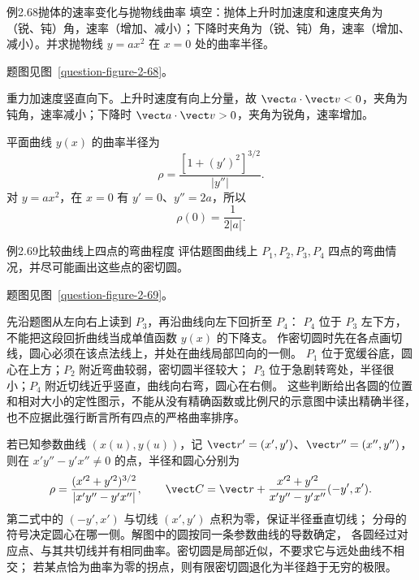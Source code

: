 \begin{origexamplebox}{例2.68\quad 抛体的速率变化与抛物线曲率}
填空：抛体上升时加速度和速度夹角为（锐、钝）角，速率（增加、减小）；下降时夹角为（锐、钝）角，速率（增加、减小）。并求抛物线 $y=ax^2$ 在 $x=0$ 处的曲率半径。
\par 题图见图~\ref{question-figure-2-68}。
\KQuestionCQ
\end{origexamplebox}
\begin{xesolution}
重力加速度竖直向下。上升时速度有向上分量，故 $\vect a\cdot\vect v<0$，夹角为钝角，速率减小；下降时 $\vect a\cdot\vect v>0$，夹角为锐角，速率增加。


\ProjectileCurvatureDiagram
平面曲线 $y(x)$ 的曲率半径为
\[
\rho=\frac{[1+(y')^2]^{3/2}}{|y''|}.
\]
对 $y=ax^2$，在 $x=0$ 有 $y'=0$、$y''=2a$，所以
\[
 \boxed{\rho(0)=\frac1{2|a|}}.
\]
\end{xesolution}

\ifdefined\Needspace{}\fi
\begin{origexamplebox}{例2.69\quad 比较曲线上四点的弯曲程度}
评估题图曲线上 $P_1,P_2,P_3,P_4$ 四点的弯曲情况，并尽可能画出这些点的密切圆。
\par 题图见图~\ref{question-figure-2-69}。
\KQuestionCR
\end{origexamplebox}
\begin{xesolution}
先沿题图从左向右上读到 $P_3$，再沿曲线向左下回折至 $P_4$：
$P_4$ 位于 $P_3$ 左下方，不能把这段回折曲线当成单值函数 $y(x)$ 的下降支。
作密切圆时先在各点画切线，圆心必须在该点法线上，并处在曲线局部凹向的一侧。
$P_1$ 位于宽缓谷底，圆心在上方；$P_2$ 附近弯曲较弱，密切圆半径较大；
$P_3$ 位于急剧转弯处，半径很小；$P_4$ 附近切线近乎竖直，曲线向右弯，圆心在右侧。
这些判断给出各圆的位置和相对大小的定性图示，不能从没有精确函数或比例尺的示意图中读出精确半径，
也不应据此强行断言所有四点的严格曲率排序。


\FourCurvaturesDiagram
若已知参数曲线 $(x(u),y(u))$，记 $\vect r'=(x',y')$、$\vect r''=(x'',y'')$，
则在 $x'y''-y'x''\ne0$ 的点，半径和圆心分别为
\[
 \rho=\frac{(x'^2+y'^2)^{3/2}}{|x'y''-y'x''|},\qquad
 \vect C=\vect r+\frac{x'^2+y'^2}{x'y''-y'x''}(-y',x').
\]
第二式中的 $(-y',x')$ 与切线 $(x',y')$ 点积为零，保证半径垂直切线；
分母的符号决定圆心在哪一侧。解图中的圆按同一条参数曲线的导数确定，
各圆经过对应点、与其共切线并有相同曲率。密切圆是局部近似，不要求它与远处曲线不相交；
若某点恰为曲率为零的拐点，则有限密切圆退化为半径趋于无穷的极限。
\end{xesolution}

